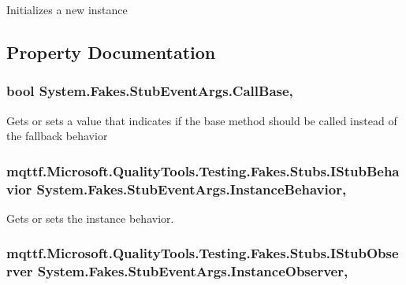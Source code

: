 Initializes a new instance



\subsection{Property Documentation}
\hypertarget{class_system_1_1_fakes_1_1_stub_event_args_a78e00956533d5fa180fd17d60228840e}{
\subsubsection[{Call\-Base}]{\setlength{\rightskip}{0pt plus 5cm}bool System.\-Fakes.\-Stub\-Event\-Args.\-Call\-Base\hspace{0.3cm}{\ttfamily [get]}, {\ttfamily [set]}}}\label{class_system_1_1_fakes_1_1_stub_event_args_a78e00956533d5fa180fd17d60228840e}


Gets or sets a value that indicates if the base method should be called instead of the fallback behavior

\hypertarget{class_system_1_1_fakes_1_1_stub_event_args_aa2b8e82d7721cfc57dc31e5848d04a6b}{
\subsubsection[{Instance\-Behavior}]{\setlength{\rightskip}{0pt plus 5cm}mqttf.\-Microsoft.\-Quality\-Tools.\-Testing.\-Fakes.\-Stubs.\-I\-Stub\-Behavior System.\-Fakes.\-Stub\-Event\-Args.\-Instance\-Behavior\hspace{0.3cm}{\ttfamily [get]}, {\ttfamily [set]}}}\label{class_system_1_1_fakes_1_1_stub_event_args_aa2b8e82d7721cfc57dc31e5848d04a6b}


Gets or sets the instance behavior.

\hypertarget{class_system_1_1_fakes_1_1_stub_event_args_a5e09383e694be4a08135808d90a33113}{
\subsubsection[{Instance\-Observer}]{\setlength{\rightskip}{0pt plus 5cm}mqttf.\-Microsoft.\-Quality\-Tools.\-Testing.\-Fakes.\-Stubs.\-I\-Stub\-Observer System.\-Fakes.\-Stub\-Event\-Args.\-Instance\-Observer\hspace{0.3cm}{\ttfamily [get]}, {\ttfamily [set]}}}\label{class_system_1_1_fakes_1_1_stub_event_args_a5e09383e694be4a08135808d90a33113}


